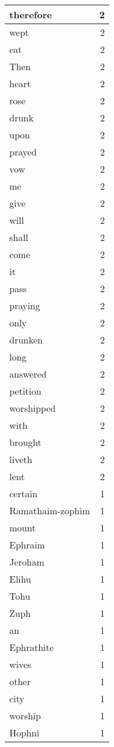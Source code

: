 \begin{center}
\begin{longtable}{l|r}
therefore & 2 \\ \hline
wept & 2 \\ \hline
eat & 2 \\ \hline
Then & 2 \\ \hline
heart & 2 \\ \hline
rose & 2 \\ \hline
drunk & 2 \\ \hline
upon & 2 \\ \hline
prayed & 2 \\ \hline
vow & 2 \\ \hline
me & 2 \\ \hline
give & 2 \\ \hline
will & 2 \\ \hline
shall & 2 \\ \hline
come & 2 \\ \hline
it & 2 \\ \hline
pass & 2 \\ \hline
praying & 2 \\ \hline
only & 2 \\ \hline
drunken & 2 \\ \hline
long & 2 \\ \hline
answered & 2 \\ \hline
petition & 2 \\ \hline
worshipped & 2 \\ \hline
with & 2 \\ \hline
brought & 2 \\ \hline
liveth & 2 \\ \hline
lent & 2 \\ \hline
certain & 1 \\ \hline
Ramathaim-zophim & 1 \\ \hline
mount & 1 \\ \hline
Ephraim & 1 \\ \hline
Jeroham & 1 \\ \hline
Elihu & 1 \\ \hline
Tohu & 1 \\ \hline
Zuph & 1 \\ \hline
an & 1 \\ \hline
Ephrathite & 1 \\ \hline
wives & 1 \\ \hline
other & 1 \\ \hline
city & 1 \\ \hline
worship & 1 \\ \hline
Hophni & 1 \\ \hline

\end{longtable}
\end{center}
